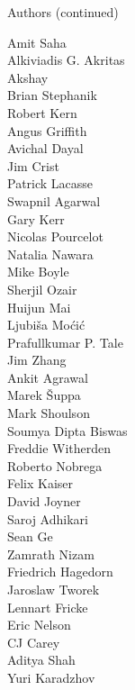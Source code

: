 \documentclass[xcolor=svgnames]{beamer}
\begin{document}
  \begin{frame}{Authors (continued)}
    \begin{multicols}{5}
      \tiny

          Amit Saha\\
          Alkiviadis G. Akritas\\
          Akshay\\
          Brian Stephanik\\
          Robert Kern\\
          Angus Griffith\\
          Avichal Dayal\\
          Jim Crist\\
          Patrick Lacasse\\
          Swapnil Agarwal\\
          Gary Kerr\\
          Nicolas Pourcelot\\
          Natalia Nawara\\
          Mike Boyle\\
          Sherjil Ozair\\
          Huijun Mai\\
          Ljubiša Moćić\\
          Prafullkumar P. Tale\\
          Jim Zhang\\
          Ankit Agrawal\\
          Marek Šuppa\\
          Mark Shoulson\\
          Soumya Dipta Biswas\\
          Freddie Witherden\\
          Roberto Nobrega\\
          Felix Kaiser\\
          David Joyner\\
          Saroj Adhikari\\
          Sean Ge\\
          Zamrath Nizam\\
          Friedrich Hagedorn\\
          Jaroslaw Tworek\\
          Lennart Fricke\\
          Eric Nelson\\
          CJ Carey\\
          Aditya Shah\\
          Yuri Karadzhov\\

\end{multicols}
\end{frame}
\end{document}

